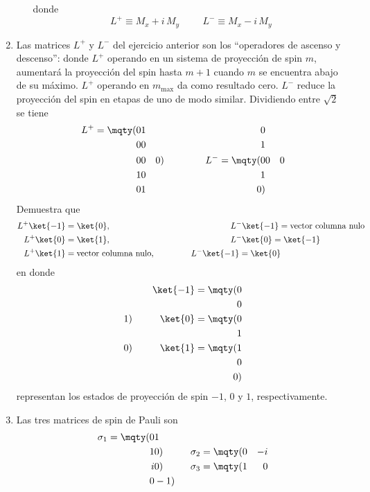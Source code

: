 \begin{enumerate}
\begin{enumerate}
donde 
\[ L^{+} \equiv M_{x} + i \, M_{y} \hspace{1cm} L^{-} \equiv M_{x} - i \, M_{y} \]
\end{enumerate}
\item Las matrices $L^{+}$ y $L^{-}$ del ejercicio anterior son los \enquote{operadores de ascenso y descenso}: donde $L^{+}$ operando en un sistema de proyección de spin $m$, aumentará la proyección del spin hasta $m + 1$ cuando $m$ se encuentra abajo de su máximo. $L^{+}$ operando en $m_{\max}$ da como resultado cero. $L^{-}$ reduce la proyección del spin en etapas de uno de modo similar. Dividiendo entre $\sqrt{2}$ se tiene
\begin{align*}
L^{+} = \mqty(0 & 1 & 0 \\ 0 & 0 & 1 \\ 0 & 0 & 0) \hspace{1.5cm} L^{-} = \mqty(0 & 0 & 0 \\ 1 & 0 & 1 \\ 0 & 1 & 0)
\end{align*}
Demuestra que
\begin{align*}
L^{+} \ket{-1} &= \ket{0}, \hspace{5cm} L^{-} \ket{-1} = \mbox{vector columna nulo} \\
L^{+} \ket{0} &= \ket{1}, \hspace{5cm} L^{-} \ket{0} = \ket{-1} \\
L^{+} \ket{1} &= \mbox{vector columna nulo}, \hspace{1.5cm} L^{-} \ket{-1} = \ket{0}
\end{align*}
en donde
\begin{align*}
\ket{-1} = \mqty(0 \\ 0 \\ 1) \hspace{1cm} \ket{0} = \mqty(0 \\ 1 \\ 0) \hspace{1cm} \ket{1} = \mqty(1 \\ 0 \\ 0)
\end{align*}
representan los estados de proyección de spin $-1$, $0$ y $1$, respectivamente.
\item Las tres matrices de spin de Pauli son
\begin{align*}
\sigma_{1} = \mqty(0 & 1 \\ 1 & 0) \hspace{1cm} \sigma_{2} = \mqty(0 & -i \\ i & 0) \hspace{1cm} \sigma_{3} = \mqty(1 & 0 \\ 0 & -1)

\end{align*}
\end{enumerate}
